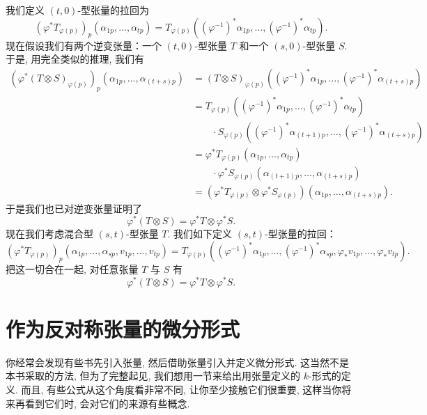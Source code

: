 我们定义 $(t,0)$-型张量的拉回为
\[
\left(\varphi^*T_{\varphi(p)}\right)_p\left(\alpha_{1p},\ldots,\alpha_{tp}\right)=T_{\varphi(p)}\left(\left(\varphi^{-1}\right)^*\alpha_{1p},\ldots,\left(\varphi^{-1}\right)^*\alpha_{tp}\right).
\]
现在假设我们有两个逆变张量：一个 $(t,0)$-型张量 $T$ 和一个 $(s,0)$-型张量 $S$. 于是, 用完全类似的推理, 我们有
\begin{align*}
\left(\varphi^*\left(T\otimes S\right)_{\varphi(p)}\right)_p\left(\alpha_{1p},\ldots,\alpha_{(t+s)p}\right)
&=\left(T\otimes S\right)_{\varphi(p)}\left(\left(\varphi^{-1}\right)^*\alpha_{1p},\ldots,\left(\varphi^{-1}\right)^*\alpha_{(t+s)p}\right)\\
&=T_{\varphi(p)}\left(\left(\varphi^{-1}\right)^*\alpha_{1p},\ldots,\left(\varphi^{-1}\right)^*\alpha_{tp}\right)\\
&\qquad\cdot S_{\varphi(p)}\left(\left(\varphi^{-1}\right)^*\alpha_{(t+1)p},\ldots,\left(\varphi^{-1}\right)^*\alpha_{(t+s)p}\right)\\
&=\varphi^*T_{\varphi(p)}\left(\alpha_{1p},\ldots,\alpha_{tp}\right)\\
&\qquad\cdot\varphi^*S_{\varphi(p)}\left(\alpha_{(t+1)p},\ldots,\alpha_{(t+s)p}\right)\\
&=\left(\varphi^*T_{\varphi(p)}\otimes\varphi^*S_{\varphi(p)}\right)\left(\alpha_{1p},\ldots,\alpha_{(t+s)p}\right).
\end{align*}
于是我们也已对逆变张量证明了
\[
\varphi^*(T\otimes S)=\varphi^*T\otimes\varphi^*S.
\]
现在我们考虑混合型 $(s,t)$-型张量 $T$. 我们如下定义 $(s,t)$-型张量的拉回：
\[
\left(\varphi^*T_{\varphi(p)}\right)_p\left(\alpha_{1p},\ldots,\alpha_{sp},v_{1p},\ldots,v_{tp}\right)
=T_{\varphi(p)}\left(\left(\varphi^{-1}\right)^*\alpha_{1p},\ldots,\left(\varphi^{-1}\right)^*\alpha_{sp},\varphi_*v_{1p},\ldots,\varphi_*v_{tp}\right).
\]
把这一切合在一起, 对任意张量 $T$ 与 $S$ 有
\[
\varphi^*(T\otimes S)=\varphi^*T\otimes\varphi^*S.
\]

\section{作为反对称张量的微分形式}

你经常会发现有些书先引入张量, 然后借助张量引入并定义微分形式. 这当然不是本书采取的方法, 但为了完整起见, 我们想用一节来给出用张量定义的 $k$-形式的定义. 而且, 有些公式从这个角度看非常不同, 让你至少接触它们很重要, 这样当你将来再看到它们时, 会对它们的来源有些概念.

